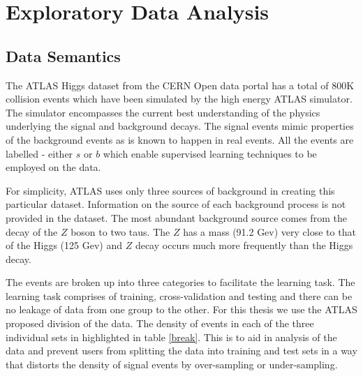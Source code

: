 \section{Exploratory Data Analysis}

\subsection{Data Semantics}
The ATLAS Higgs dataset from the CERN Open data portal has a total of 800K collision events which have been simulated by the high energy ATLAS simulator. The simulator encompasses the current best understanding of the physics underlying the signal and background decays. The signal events mimic properties of the background events as is known to happen in real events. All the events are labelled - either $s$ or $b$ which enable supervised learning techniques to be employed on the data. 

For simplicity, ATLAS uses only three sources of background in creating this particular dataset. Information on the source of each background process is not provided in the dataset. The most abundant background source comes from the decay of the $Z$ boson to two taus. The $Z$ has a mass (91.2 Gev) very close to that of the Higgs (125 Gev) and $Z$ decay occurs much more frequently than the Higgs decay. 

The events are broken up into three categories to facilitate the learning task. The learning task comprises of training, cross-validation and testing and there can be no leakage of data from one group to the other. For this thesis we use the ATLAS proposed division of the data. The density of events in each of the three individual sets in highlighted in table \ref{break}.
This is to aid in analysis of the data and prevent users from splitting the data into training and test sets in a way that distorts the density of signal events by over-sampling or under-sampling.  

